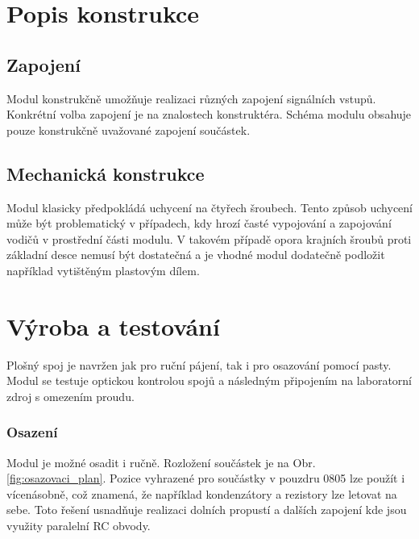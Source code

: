 \documentclass[12pt,a4paper,oneside]{article}
\begin{document}
\section{Popis konstrukce}

\subsection{Zapojení}

Modul konstrukčně umožňuje realizaci různých zapojení signálních vstupů.  Konkrétní volba zapojení je na znalostech konstruktéra.  Schéma modulu obsahuje pouze konstrukčně uvažované zapojení součástek. 



\subsection{Mechanická konstrukce}

Modul klasicky předpokládá uchycení na čtyřech šroubech. Tento způsob uchycení může být problematický v případech, kdy hrozí časté vypojování a zapojování vodičů v prostřední části modulu. V takovém případě opora krajních šroubů proti základní desce nemusí být dostatečná a je vhodné modul dodatečně podložit například vytištěným plastovým dílem.  

\section{Výroba a testování}

Plošný spoj je navržen jak pro ruční pájení, tak i pro osazování pomocí pasty.  Modul se testuje optickou kontrolou spojů a následným připojením na laboratorní zdroj s omezením proudu.

\subsubsection{Osazení}

Modul je možné osadit i ručně. Rozložení součástek je na Obr. \ref{fig:osazovaci_plan}. Pozice vyhrazené pro součástky v pouzdru 0805 lze použít i vícenásobně, což znamená, že například kondenzátory a rezistory lze letovat na sebe. Toto řešení usnadňuje realizaci dolních propustí a dalších zapojení kde jsou využity paralelní RC obvody. 
\end{document}
